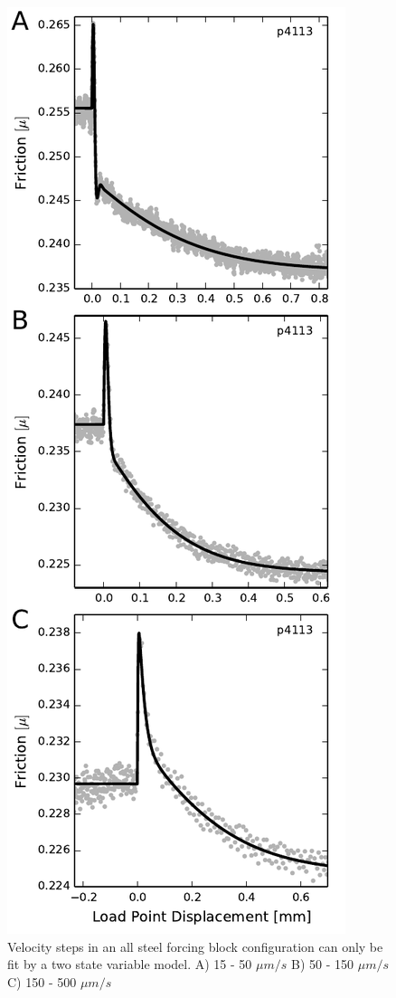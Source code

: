 \begin{figure}
\begin{centering}
\includegraphics[scale=0.8]{chap_granular_stiffness/Fig8.pdf}
\caption{\label{fig:model_fits}
Velocity steps in an all steel forcing block configuration can only be fit by a two state variable model.  A) 15 - 50 $\mu m/s$ B) 50 - 150 $\mu m/s$ C) 150 - 500 $\mu m/s$}
\end{centering}
\end{figure}


